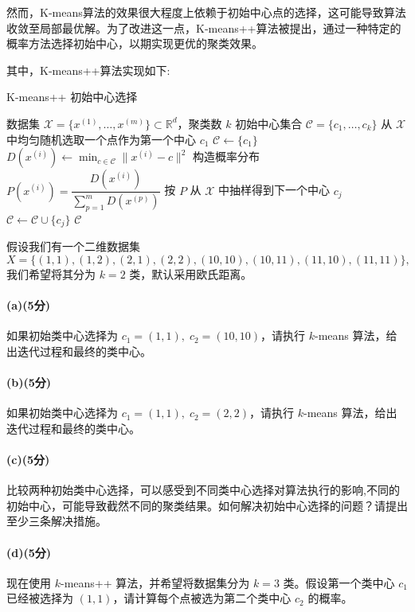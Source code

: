 \documentclass[12pt,a4paper]{article}%
\begin{document}
然而，K-means算法的效果很大程度上依赖于初始中心点的选择，这可能导致算法收敛至局部最优解。为了改进这一点，K-means++算法被提出，通过一种特定的概率方法选择初始中心，以期实现更优的聚类效果。

其中，K-means++算法实现如下:

\begin{algorithm}[H]
  \caption{K-means++ 初始中心选择}
  \label{alg:kmeanspp}
  \begin{algorithmic}[1]
    \Require 数据集 $\mathcal{X}=\{x^{(1)},\dots,x^{(m)}\}\subset\mathbb{R}^d$，聚类数 $k$
    \Ensure  初始中心集合 $\mathcal{C}=\{c_1,\dots,c_k\}$
    \State 从 $\mathcal{X}$ 中均匀随机选取一个点作为第一个中心 $c_1$
    \State $\mathcal{C}\gets \{c_1\}$
                           
            \State $D(x^{(i)})\gets \min_{c\in\mathcal{C}}\|x^{(i)}-c\|^2$
        \EndFor
        \State 构造概率分布 $P(x^{(i)})=\dfrac{D(x^{(i)})}{\sum_{p=1}^{m}D(x^{(p)})}$
        \State 按 $P$ 从 $\mathcal{X}$ 中抽样得到下一个中心 $c_j$
        \State $\mathcal{C}\gets \mathcal{C}\cup\{c_j\}$
    \EndFor
    \State \Return $\mathcal{C}$
  \end{algorithmic}
\end{algorithm}

假设我们有一个二维数据集
\[
X = \{(1,1), (1,2), (2,1), (2,2), (10,10), (10,11), (11,10), (11,11)\},
\]
我们希望将其分为 $k = 2$ 类，默认采用欧氏距离。


\paragraph*{(a)(5分)}如果初始类中心选择为 $c_1 = (1,1), \; c_2 = (10,10)$，请执行 $k$-means 算法，给出迭代过程和最终的类中心。
\paragraph*{(b)(5分)}如果初始类中心选择为 $c_1 = (1,1), \; c_2 = (2,2)$，请执行 $k$-means 算法，给出迭代过程和最终的类中心。
\paragraph*{(c)(5分)}比较两种初始类中心选择，可以感受到不同类中心选择对算法执行的影响,不同的初始中心，可能导致截然不同的聚类结果。如何解决初始中心选择的问题？请提出至少三条解决措施。
\paragraph*{(d)(5分)}现在使用 $k$-means++ 算法，并希望将数据集分为 $k = 3$ 类。假设第一个类中心 $c_1$ 已经被选择为 $(1,1)$，请计算每个点被选为第二个类中心 $c_2$ 的概率。
\end{document}
